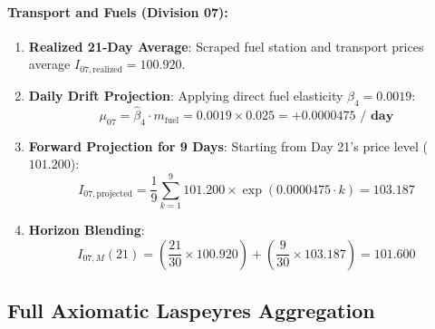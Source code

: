 \documentclass[a4paper, 11pt]{article}
\begin{document}
\paragraph{Transport and Fuels (Division 07):}
\begin{enumerate}[noitemsep]
    \item \textbf{Realized 21-Day Average}: Scraped fuel station and transport prices average $I_{07, \text{realized}} = \mathbf{100.920}$.
    \item \textbf{Daily Drift Projection}: Applying direct fuel elasticity $\hat{\beta}_4 = 0.0019$:
    \begin{equation}
        \mu_{07} = \hat{\beta}_4 \cdot m_{\text{fuel}} = 0.0019 \times 0.025 = \mathbf{+0.0000475 \text{ / day}}
    \end{equation}
    \item \textbf{Forward Projection for 9 Days}: Starting from Day 21's price level ($101.200$):
    \begin{equation}
        I_{07, \text{projected}} = \frac{1}{9} \sum_{k=1}^9 101.200 \times \exp\left( 0.0000475 \cdot k \right) = \mathbf{103.187}
    \end{equation}
    \item \textbf{Horizon Blending}:
    \begin{equation}
        I_{07, M}(21) = \left( \frac{21}{30} \times 100.920 \right) + \left( \frac{9}{30} \times 103.187 \right) = \mathbf{101.600}
    \end{equation}
\end{enumerate}

\subsection{Full Axiomatic Laspeyres Aggregation}
\end{document}

